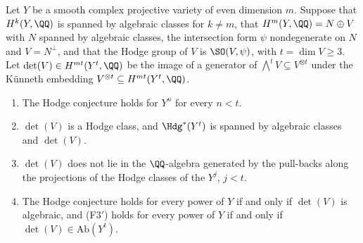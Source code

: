 \begin{proposition}
\label{prop:orthpowers}
Let $Y$ be a smooth complex projective variety of even dimension $m$. Suppose
that $H^{k}(Y,\QQ)$ is spanned by algebraic classes for $k\ne m$, that
$H^{m}(Y,\QQ)=N\oplus V$ with $N$ spanned by algebraic classes, the
intersection form $\psi$ nondegenerate on $N$ and $V=N^{\perp}$, and that the
Hodge group of $V$ is $\SO(V,\psi)$, with $t=\dim V\ge3$. Let
$\det(V)\in H^{mt}(Y^{t},\QQ)$ be the image of a generator of
$\bigwedge^{t}V\subseteq V^{\otimes t}$ under the K\"unneth embedding
$V^{\otimes t}\subseteq H^{mt}(Y^{t},\QQ)$.
\begin{enumerate}[label=\textup{(\roman*)},leftmargin=2.6em,itemsep=2pt]
\item The Hodge conjecture holds for $Y^{n}$ for every $n<t$.
\item $\det(V)$ is a Hodge class, and $\Hdg^{*}(Y^{t})$ is spanned by
  algebraic classes and $\det(V)$.
\item $\det(V)$ does not lie in the $\QQ$-algebra generated by the pull-backs
  along the projections of the Hodge classes of the $Y^{j}$, $j<t$.
\item The Hodge conjecture holds for every power of $Y$ if and only if
  $\det(V)$ is algebraic, and \textup{(F3$'$)} holds for every power of $Y$
  if and only if $\det(V)\in\mathrm{Ab}(Y^{t})$.
\end{enumerate}
\end{proposition}

